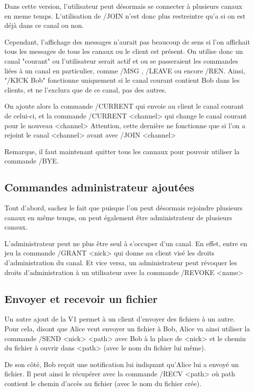 \documentclass[10pt]{article}
\begin{document}
Dans cette version, l'utilisateur peut désormais se connecter à plusieurs canaux en meme temps.
L'utilisation de /JOIN n'est donc plus restreintre qu'a si on est déjà dans ce canal ou non.

Cependant, l'affichage des messages n'aurait pas beaucoup de sens si l'on affichait tous les messages de tous les canaux ou le client est présent.
On utilise donc un canal "courant" ou l'utilisateur serait actif et ou se passeraient les commandes liées à un canal en particulier, comme /MSG , /LEAVE ou encore /REN.
Ainsi, "/KICK Bob" fonctionne uniquement si le canal courant contient Bob dans les clients, et ne l'exclura que de ce canal, pas des autres.

On ajoute alors la commande /CURRENT qui envoie au client le canal courant de celui-ci, et la commande /CURRENT <channel> qui change le canal courant pour le nouveau <channel>
Attention, cette dernière ne fonctionne que si l'on a rejoint le canal <channel> avant avec /JOIN <channel>

Remarque, il faut maintenant quitter tous les cannaux pour pouvoir utiliser la commande /BYE.

\subsection{Commandes administrateur ajoutées}
Tout d'abord, sachez le fait que puisque l'on peut désormais rejoindre plusieurs canaux en même temps, on peut également être administrateur de plusieurs canaux.


L'administrateur peut ne plus être seul à s'occuper d'un canal.
En effet, entre en jeu la commande /GRANT <nick> qui donne au client visé les droits d'administration du canal.
Et vice versa, un administrateur peut révoquer les droits d'administration à un utilisateur avec la commande /REVOKE <name>

\subsection{Envoyer et recevoir un fichier}

Un autre ajout de la V1 permet à un client d'envoyer des fichiers à un autre. Pour cela, disont que Alice veut envoyer un fichier à Bob, Alice va ainsi utiliser la commande 
/SEND <nick> <path> avec Bob à la place de <nick> et le chemin du fichier à ouvrir dans <path> (avec le nom du fichier lui même). 

De son côté, Bob reçoit une notification lui indiquant qu'Alice lui a envoyé un fichier. Il peut ainsi le récupérer avec la commande /RECV <path> 
où path contient le chemin d'accès au fichier (avec le nom du fichier crée). 
\end{document}
